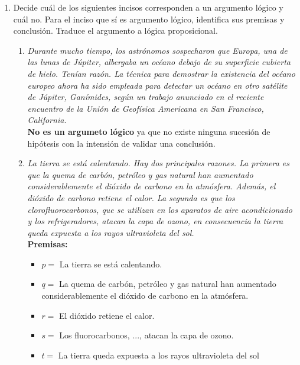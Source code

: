 \documentclass[10pt,letterpaper]{article}
\begin{document}
\begin{enumerate}
    \item Decide cuál de los siguientes incisos corresponden a un argumento lógico y
    cuál no. Para el inciso que sí es argumento lógico, identifica sus premisas y
    conclusión. Traduce el argumento a lógica proposicional.

        \begin{enumerate}
            \item \textit{
                Durante mucho tiempo, los astrónomos sospecharon que Europa, una
                de las lunas de Júpiter, albergaba un océano debajo de su superficie
                cubierta de hielo. Tenían razón. La técnica para demostrar la
                existencia del océano europeo ahora ha sido empleada para detectar
                un océano en otro satélite de Júpiter, Ganímides, según un trabajo
                anunciado en el reciente encuentro de la Unión de Geofísica Americana
                en San Francisco, California.
            }\\

            \textbf{No es un argumeto lógico} ya que no existe ninguna sucesión de
            hipótesis con la intensión de validar una conclusión.

            \item \textit{
                La tierra se está calentando. Hay dos principales razones. La primera
                es que la quema de carbón, petróleo y gas natural han aumentado
                considerablemente el dióxido de carbono en la atmósfera. Además, el
                dióxido de carbono retiene el calor. La segunda es que los
                clorofluorocarbonos, que se utilizan en los aparatos de aire
                acondicionado y los refrigeradores, atacan la capa de ozono, en
                consecuencia la tierra queda expuesta a los rayos ultravioleta del sol.
            }\\

            \textbf{Premisas:}
            \begin{itemize}
                \item $p = $ La tierra se está calentando.
                \item $q = $ La quema de carbón, petróleo y gas natural han aumentado
                considerablemente el dióxido de carbono en la atmósfera.
                \item $r = $ El dióxido retiene el calor.
                \item $s = $ Los fluorocarbonos, ..., atacan la capa de ozono.
                \item $t = $ La tierra queda expuesta a los rayos ultravioleta del sol
            \end{itemize}


\end{enumerate}
\end{enumerate}
\end{document}
